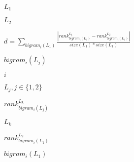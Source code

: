 \documentclass{article}
\begin{document}
$L_1$
\pagebreak

$L_2$
\pagebreak

$d = \sum_{bigram_i(L_1)} \frac{ | rank_{bigram_i(L_1)}^{L_1} - rank_{bigram_i(L_1)}^{L_2} | }{size(L_1) * size(L_1)}$
\pagebreak

$bigram_i(L_j)$
\pagebreak

$i$
\pagebreak

$L_j, j \in \{1, 2\}$
\pagebreak

$rank_{bigram_i(L_j)}^{L_k}$
\pagebreak

$L_k$
\pagebreak

$rank_{bigram_i(L_1)}^{L_2}$
\pagebreak

$bigram_i(L_1)$
\pagebreak
\end{document}
